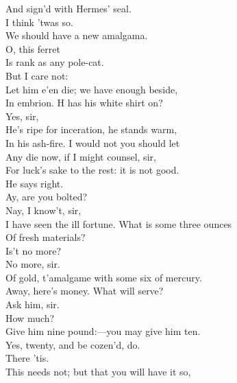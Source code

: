 \documentclass[a4paper,oneside]{memoir}
\begin{document}
\begin{drama*}
And sign'd with Hermes' seal.\\
\subtlespeaks {} I think 'twas so.\\
We should have a new amalgama.\\
\surlyspeaks {}  O, this ferret\\
Is rank as any pole-cat.\\
\subtlespeaks {} But I care not:\\
Let him e'en die; we have enough beside,\\
In embrion. H has his white shirt on?\\
\facespeaks {} Yes, sir,\\
He's ripe for inceration, he stands warm,\\
In his ash-fire. I would not you should let\\
Any die now, if I might counsel, sir,\\
For luck's sake to the rest: it is not good.\\
\mammonspeaks He says right.\\
\surlyspeaks {}  Ay, are you bolted?\\
\facespeaks {} Nay, I know't, sir,\\
I have seen the ill fortune. What is some three ounces\\
Of fresh materials?\\
\mammonspeaks {} Is't no more?\\
\facespeaks {} No more, sir.\\
Of gold, t'amalgame with some six of mercury.\\
\mammonspeaks Away, here's money. What will serve?\\
\facespeaks {} Ask him, sir.\\
\mammonspeaks How much?\\
\subtlespeaks {} Give him nine pound:---you may give him ten.\\
\surlyspeaks Yes, twenty, and be cozen'd, do.\\
\mammonspeaks {} There 'tis.\\
\subtlespeaks This needs not; but that you will have it so,\\

\end{drama*}
\end{document}
